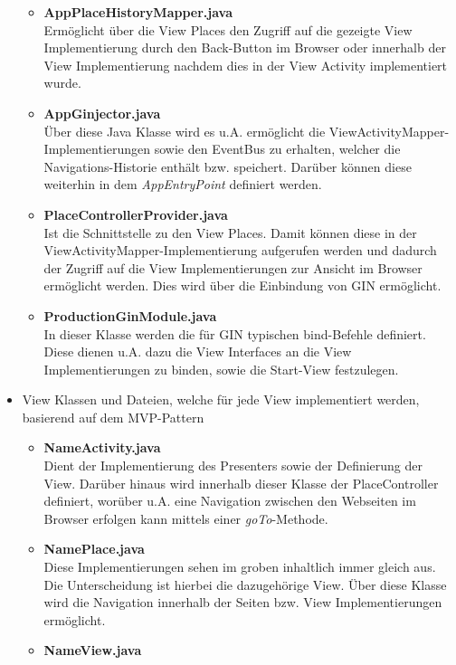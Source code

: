 \begin{itemize}
\begin{itemize}
    \item \textbf{AppPlaceHistoryMapper.java}\\
    Ermöglicht über die View Places den Zugriff auf die gezeigte View
    Implementierung durch den Back-Button im Browser oder innerhalb der View
    Implementierung nachdem dies in der View Activity implementiert wurde.
    \item \textbf{AppGinjector.java}\\
    Über diese Java Klasse wird es u.A. ermöglicht die
    ViewActivityMapper-Implementierungen sowie den EventBus zu
    erhalten, welcher die Navigations-Historie enthält bzw. speichert. Darüber
    können diese weiterhin in dem \textit{AppEntryPoint} definiert werden.
    \item \textbf{PlaceControllerProvider.java}\\
    Ist die Schnittstelle zu den View Places. Damit können diese in der
    ViewActivityMapper-Implementierung aufgerufen werden und dadurch der Zugriff
    auf die View Implementierungen zur Ansicht im Browser ermöglicht werden.
    Dies wird über die Einbindung von GIN ermöglicht.
    \item \textbf{ProductionGinModule.java}\\
    In dieser Klasse werden die für GIN typischen bind-Befehle definiert. Diese
    dienen u.A. dazu die View Interfaces an die View Implementierungen zu
    binden, sowie die Start-View festzulegen.
  \end{itemize}  
  \item View Klassen und Dateien, welche für jede View implementiert werden,
  basierend auf dem MVP-Pattern
    \begin{itemize}
    \item \textbf{\grqq{}Name\grqq{}Activity.java}\\
    Dient der Implementierung des Presenters sowie der Definierung der View.
    Darüber hinaus wird innerhalb dieser Klasse der PlaceController definiert,
    worüber u.A. eine Navigation zwischen den Webseiten im Browser erfolgen kann
    mittels einer \textit{goTo}-Methode.
    \item \textbf{\grqq{}Name\grqq{}Place.java}\\
    Diese Implementierungen sehen im groben inhaltlich immer gleich aus. Die
    Unterscheidung ist hierbei die dazugehörige View. Über diese Klasse wird die
    Navigation innerhalb der Seiten bzw. View Implementierungen ermöglicht.
    \item \textbf{\grqq{}Name\grqq{}View.java}\\

\end{itemize}
\end{itemize}

